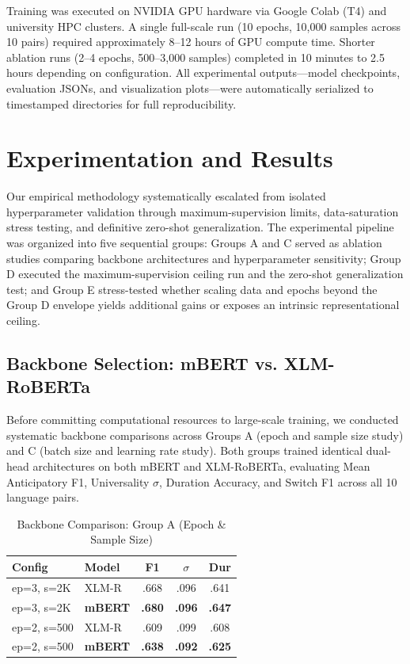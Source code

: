 \documentclass[sigconf,nonacm]{acmart}
\begin{document}
Training was executed on NVIDIA GPU hardware via Google Colab (T4) and university HPC clusters. A single full-scale run (10 epochs, 10,000 samples across 10 pairs) required approximately 8--12 hours of GPU compute time. Shorter ablation runs (2--4 epochs, 500--3,000 samples) completed in 10 minutes to 2.5 hours depending on configuration. All experimental outputs---model checkpoints, evaluation JSONs, and visualization plots---were automatically serialized to timestamped directories for full reproducibility.

\section{Experimentation and Results}

Our empirical methodology systematically escalated from isolated hyperparameter validation through maximum-supervision limits, data-saturation stress testing, and definitive zero-shot generalization. The experimental pipeline was organized into five sequential groups: Groups A and C served as ablation studies comparing backbone architectures and hyperparameter sensitivity; Group D executed the maximum-supervision ceiling run and the zero-shot generalization test; and Group E stress-tested whether scaling data and epochs beyond the Group D envelope yields additional gains or exposes an intrinsic representational ceiling.

\subsection{Backbone Selection: mBERT vs. XLM-RoBERTa}
Before committing computational resources to large-scale training, we conducted systematic backbone comparisons across Groups A (epoch and sample size study) and C (batch size and learning rate study). Both groups trained identical dual-head architectures on both mBERT and XLM-RoBERTa, evaluating Mean Anticipatory F1, Universality $\sigma$, Duration Accuracy, and Switch F1 across all 10 language pairs.

\begin{table}[h]
\centering
\small
\caption{Backbone Comparison: Group A (Epoch \& Sample Size)}
\label{tab:groupA}
\begin{tabular}{llccc}
\toprule
\textbf{Config} & \textbf{Model} & \textbf{F1} & \textbf{$\sigma$} & \textbf{Dur} \\
\midrule
ep=3, s=2K & XLM-R & .668 & .096 & .641 \\
ep=3, s=2K & \textbf{mBERT} & \textbf{.680} & \textbf{.096} & \textbf{.647} \\
\midrule
ep=2, s=500 & XLM-R & .609 & .099 & .608 \\
ep=2, s=500 & \textbf{mBERT} & \textbf{.638} & \textbf{.092} & \textbf{.625} \\
\bottomrule
\end{tabular}
\end{table}
\end{document}
